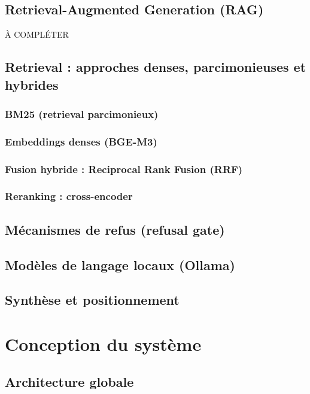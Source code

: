 \documentclass{rapportECL}
\begin{document}
\subsection{Retrieval-Augmented Generation (RAG)}

À COMPLÉTER

\subsection{Retrieval : approches denses, parcimonieuses et hybrides}

\subsubsection{BM25 (retrieval parcimonieux)}
\subsubsection{Embeddings denses (BGE-M3)}
\subsubsection{Fusion hybride : Reciprocal Rank Fusion (RRF)}
\subsubsection{Reranking : cross-encoder}

\subsection{Mécanismes de refus (refusal gate)}

\subsection{Modèles de langage locaux (Ollama)}

\subsection{Synthèse et positionnement}

\section{Conception du système}

\subsection{Architecture globale}
\end{document}
